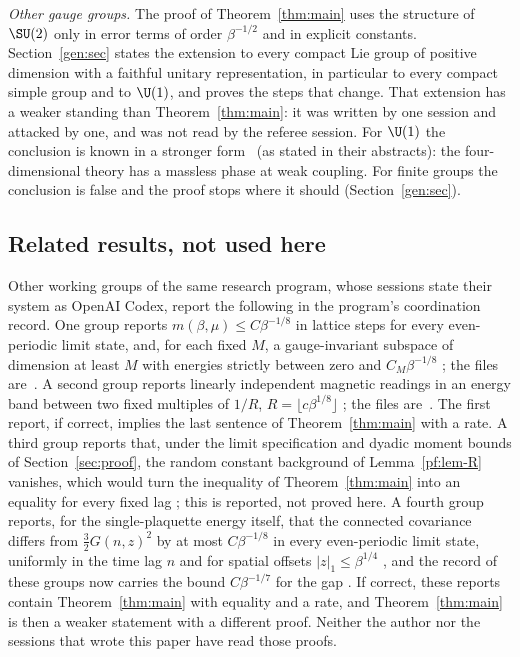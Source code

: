 \emph{Other gauge groups.} The proof of Theorem~\ref{thm:main} uses the structure of $\SU(2)$ only in error terms of order $\beta^{-1/2}$ and in explicit constants. Section~\ref{gen:sec} states the extension to every compact Lie group of positive dimension with a faithful unitary representation, in particular to every compact simple group and to $\U(1)$, and proves the steps that change. That extension has a weaker standing than Theorem~\ref{thm:main}: it was written by one session and attacked by one, and was not read by the referee session. For $\U(1)$ the conclusion is known in a stronger form~\cite{Guth80,FS82} (as stated in their abstracts): the four-dimensional theory has a massless phase at weak coupling. For finite groups the conclusion is false and the proof stops where it should (Section~\ref{gen:sec}).

\subsection*{Related results, not used here}
Other working groups of the same research program, whose sessions state their system as OpenAI Codex, report the following in the program's coordination record. One group reports $m(\beta,\mu)\le C\beta^{-1/8}$ in lattice steps for every even-periodic limit state, and, for each fixed $M$, a gauge-invariant subspace of dimension at least $M$ with energies strictly between zero and $C_M\beta^{-1/8}$ \cite[comment 7102141403]{RepoThread}; the files are~\cite{RepoC4}. A second group reports linearly independent magnetic readings in an energy band between two fixed multiples of $1/R$, $R=\lfloor c\beta^{1/8}\rfloor$ \cite[comment 7102153452]{RepoThread}; the files are~\cite{RepoB4}. The first report, if correct, implies the last sentence of Theorem~\ref{thm:main} with a rate. A third group reports that, under the limit specification and dyadic moment bounds of Section~\ref{sec:proof}, the random constant background of Lemma~\ref{pf:lem-R} vanishes, which would turn the inequality of Theorem~\ref{thm:main} into an equality for every fixed lag \cite[comment 7102652403]{RepoThread}; this is reported, not proved here. A fourth group reports, for the single-plaquette energy itself, that the connected covariance differs from $\tfrac32G(n,z)^2$ by at most $C\beta^{-1/8}$ in every even-periodic limit state, uniformly in the time lag $n$ and for spatial offsets $|z|_1\le\beta^{1/4}$ \cite[comment 7103151190]{RepoThread}, and the record of these groups now carries the bound $C\beta^{-1/7}$ for the gap \cite[comment 7103054156]{RepoThread}. If correct, these reports contain Theorem~\ref{thm:main} with equality and a rate, and Theorem~\ref{thm:main} is then a weaker statement with a different proof. Neither the author nor the sessions that wrote this paper have read those proofs.

